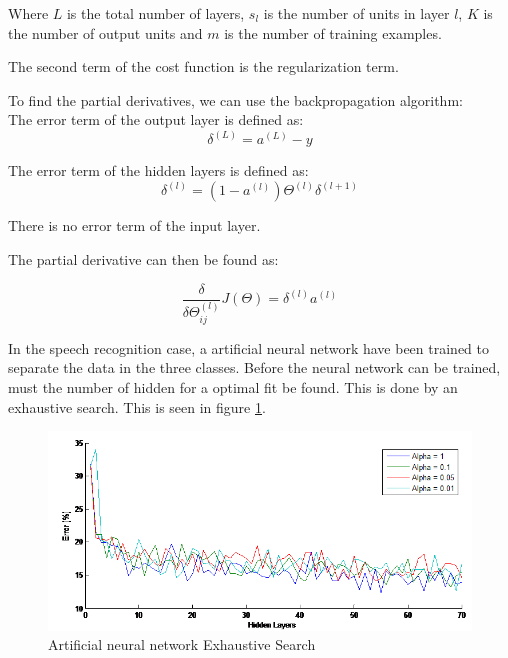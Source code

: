 Where $L$ is the total number of layers, $s_l$ is the number of units in layer $l$, $K$ is the number of output units and $m$ is the number of training examples.

The second term of the cost function is the regularization term.


To find the partial derivatives, we can use the backpropagation algorithm: \\

The error term of the output layer is defined as:
\begin{equation}
\delta^{(L)} = a^{(L)}-y
\end{equation}

The error term of the hidden layers is defined as:
\begin{equation}
\delta^{(l)} = (1-a^{(l)})\Theta^{(l)}\delta^{(l+1)}
\end{equation}

There is no error term of the input layer. 

The partial derivative can then be found as:

\begin{equation}
\frac{\delta}{\delta\Theta^{(l)}_{ij}}J(\Theta) = 
\delta^{(l)}a^{(l)}
\end{equation}


In the speech recognition case, a artificial neural network have been trained to separate the data in the three classes. Before the neural network can be trained, must the number of hidden for a optimal fit be found. This is done by an exhaustive search. This is seen in figure \ref{fig:NNsearch}.

\begin{figure}[H]
\centering
\includegraphics[scale=0.6]{billeder/TraningErrorNN}
\caption{Artificial neural network Exhaustive Search}
\label{fig:NNsearch}
\end{figure} 

